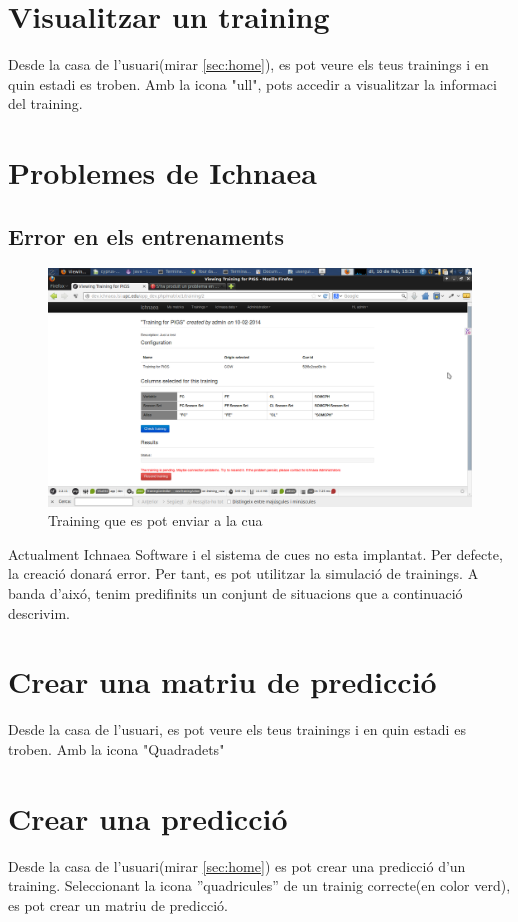 \section{Visualitzar un training}
Desde la casa de l'usuari(mirar \ref{sec:home}), es pot veure els teus trainings i en quin estadi es troben. Amb la icona "ull", pots accedir a visualitzar la informaci del training.

\section{Problemes de Ichnaea}
\label{sec:ichnaeaErrors}
\subsection{Error en els entrenaments}
\begin{figure}[h!]
  \centering
  \includegraphics[scale=0.2]{img/userguide/view_training_pending.png}
  \caption{Training que es pot enviar a la cua}
  \label{fig:placement}
\end{figure}

Actualment Ichnaea Software i el sistema de cues no esta implantat. Per defecte, la creaci\'{o} donar\'{a} error. Per tant, es pot utilitzar la simulaci\'{o} de trainings.
A banda d'aix\'{o}, tenim predifinits un conjunt de situacions que a continuaci\'{o} descrivim.

\section{Crear una matriu de predicci\'{o}}
Desde la casa de l'usuari, es pot veure els teus trainings i en quin estadi es troben. Amb la icona "Quadradets"

\section{Crear una predicci\'{o}}
Desde la casa de l'usuari(mirar \ref{sec:home}) es pot crear una predicci\'{o} d'un training. Seleccionant la icona ''quadricules'' de un trainig correcte(en color verd), es pot crear un matriu de predicci\'{o}.

